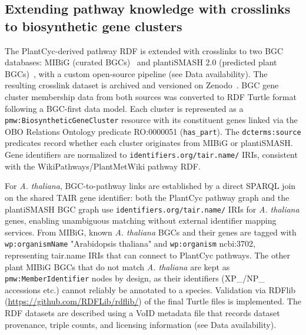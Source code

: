 \documentclass[11pt,a4paper]{article}
\begin{document}
\subsection*{Extending pathway knowledge with crosslinks to biosynthetic gene clusters}
The PlantCyc-derived pathway RDF is extended with crosslinks to two BGC databases: MIBiG (curated
BGCs)~\cite{zdouc2025} and plantiSMASH 2.0 (predicted plant BGCs)~\cite{delpup2026}, with a custom
open-source pipeline (see Data availability). The resulting crosslink dataset is archived and
versioned on Zenodo~\cite{delpup2026bgc}. BGC gene cluster membership data from both sources was
converted to RDF Turtle format following a BGC-first data model. Each cluster is represented as a
\texttt{pmw:BiosyntheticGeneCluster} resource with its constituent genes linked via the OBO Relations
Ontology predicate RO:0000051 (\texttt{has\_part}). The \texttt{dcterms:source} predicates record
whether each cluster originates from MIBiG or plantiSMASH. Gene identifiers are normalized to
\texttt{identifiers.org/tair.name/} IRIs, consistent with the WikiPathways/PlantMetWiki pathway RDF.

For \textit{A. thaliana}, BGC-to-pathway links are established by a direct SPARQL join on the shared
TAIR gene identifier: both the PlantCyc pathway graph and the plantiSMASH BGC graph use
\texttt{identifiers.org/tair.name/} IRIs for \textit{A. thaliana} genes, enabling unambiguous matching
without external identifier mapping services. From MIBiG, known \textit{A. thaliana} BGCs and their
genes are tagged with \texttt{wp:organismName} "Arabidopsis thaliana" and \texttt{wp:organism}
ncbi:3702, representing tair.name IRIs that can connect to PlantCyc pathways. The other plant MIBiG
BGCs that do not match \textit{A. thaliana} are kept as \texttt{pmw:MemberIdentifier} nodes by design,
as their identifiers (XP\_/NP\_ accessions etc.) cannot reliably be annotated to a species. Validation
via RDFlib (\url{https://github.com/RDFLib/rdflib/}) of the final Turtle files is implemented. The RDF
datasets are described using a VoID metadata file that records dataset provenance, triple counts, and
licensing information (see Data availability).
\end{document}
